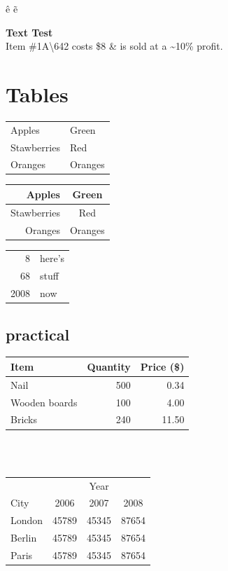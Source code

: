 \documentclass[a4paper,12pt]{article}
\begin{document}
\^ e
\~ e

\textbf {Text Test}
\\
Item \#1A\textbackslash642 costs \$8 \& is sold at a \~{}10\% profit.

\section{Tables}
\begin{tabular}{|l|l|}
Apples & Green \\
Stawberries & Red \\
Oranges & Oranges \\
\end{tabular}

\begin{tabular}{rc}
Apples & Green \\
\hline
Stawberries & Red \\
\cline{1-1}
Oranges & Oranges \\
\end{tabular}

\begin{tabular}{|r|l|}
\hline
8 & here's \\
\cline{2-2}
68 & stuff \\
\hline \hline
2008 & now \\
\hline
\end{tabular}


\subsection{practical}
\begin{tabular}{l|r|r}
Item & Quantity & Price (\$) \\
\hline
Nail & 500 & 0.34 \\
Wooden boards & 100 & 4.00 \\
Bricks & 240 & 11.50 \\
\end{tabular}
\\
\\

\begin{tabular}{l|ccc}
&&Year \\
\cline{2-4}
City & 2006 & 2007 & 2008 \\
\hline
London & 45789 & 45345 & 87654 \\
Berlin & 45789 & 45345 & 87654 \\
Paris & 45789 & 45345 & 87654 \\
\end{tabular}
\end{document}
